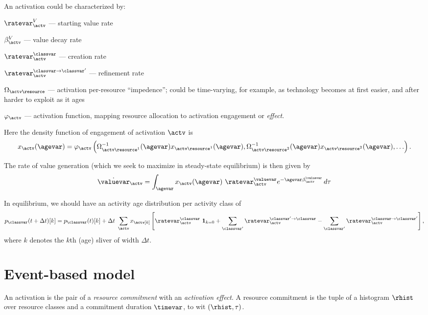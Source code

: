 \documentclass[10pt,a4paper]{article}
\begin{document}
An activation could be characterized by:

\makecommand{\ratevar}{\lambda}
\makecommand{\agevar}{\tau}

$\ratevar^V_\actv$ --- starting value rate

$\beta^V_\actv$ --- value decay rate

$\ratevar^\classvar_\actv$ --- creation rate

$\ratevar^{\classvar \to \classvar'}_\actv$ --- refinement rate

$\Omega_{\actv \resource}$ --- activation per-resource ``impedence''; could be time-varying, for example, as technology becomes at first easier, and after harder to exploit as it ages

$\varphi_\actv$ --- activation function,
mapping resource allocation to activation engagement or \emph{effect}.

Here the density function of engagement of activation $\actv$ is
\[
x_\actv(\agevar) = \varphi_\actv\left(
	\Omega_{\actv \resource^1}^{-1}(\agevar) x_{\actv \resource^1}(\agevar),
	\Omega_{\actv \resource^2}^{-1}(\agevar) x_{\actv \resource^2}(\agevar),
	\ldots
\right).
\]

The rate of value generation (which we seek to maximize in steady-state equilibrium) is then given by
\[
\dot\valuevar_{\actv}
	= \int_{\agevar} 
		x_\actv(\agevar) \
		\ratevar^\valuevar_\actv
		e^{-\agevar \beta^\valuevar_\actv}
		\, d\tau
\]

In equilibrium,
we should have an activity age distribution per activity class of
\[
p_{\classvar}(t + \Delta t)[k]
	= p_{\classvar}(t)[k]
	+ \Delta t \ \sum_\actv
		x_\actv[k] 		
		\left[
			\ratevar_\actv^\classvar
			\ {\bf 1}_{k=0}
		+ \sum_{\classvar'} \ratevar_\actv^{\classvar' \to \classvar}
		- \sum_{\classvar'} \ratevar_\actv^{\classvar \to \classvar'}
		\right],
\]
where $k$ denotes the $k$th (age) sliver of width $\Delta t$.



\section{Event-based model}

An activation is the pair of a \emph{resource commitment} with an \emph{activation effect}.
A resource commitment is the tuple of a histogram $\rhist$ over resource classes and a commitment duration $\timevar$, to wit $(\rhist, \tau)$.
\end{document}
